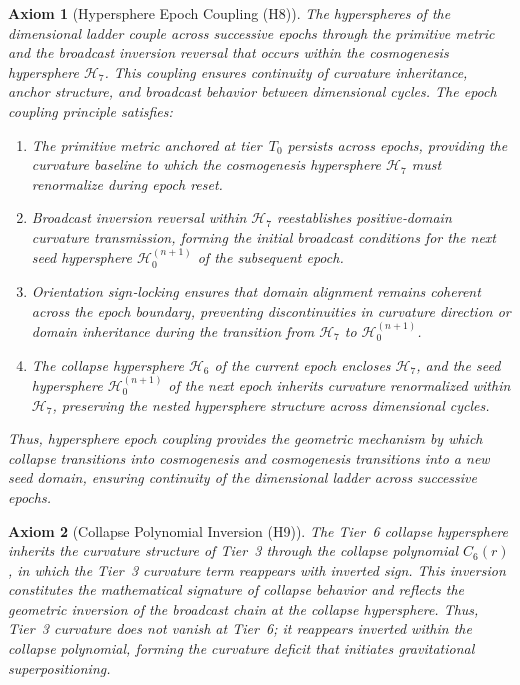 \documentclass[final,onefignum,onetabnum]{siamart}
\newtheorem{axiom}{Axiom}
\begin{document}
\begin{axiom}[Hypersphere Epoch Coupling (H8)]
The hyperspheres of the dimensional ladder couple across successive epochs through the primitive metric and the broadcast inversion reversal that occurs within the cosmogenesis hypersphere $\mathcal{H}_{7}$. This coupling ensures continuity of curvature inheritance, anchor structure, and broadcast behavior between dimensional cycles. The epoch coupling principle satisfies:

\begin{enumerate}
    \item The primitive metric anchored at tier~$T_{0}$ persists across epochs, providing the curvature baseline to which the cosmogenesis hypersphere $\mathcal{H}_{7}$ must renormalize during epoch reset.
    \item Broadcast inversion reversal within $\mathcal{H}_{7}$ reestablishes positive‑domain curvature transmission, forming the initial broadcast conditions for the next seed hypersphere $\mathcal{H}_{0}^{(n+1)}$ of the subsequent epoch.
    \item Orientation sign‑locking ensures that domain alignment remains coherent across the epoch boundary, preventing discontinuities in curvature direction or domain inheritance during the transition from $\mathcal{H}_{7}$ to $\mathcal{H}_{0}^{(n+1)}$.
    \item The collapse hypersphere $\mathcal{H}_{6}$ of the current epoch encloses $\mathcal{H}_{7}$, and the seed hypersphere $\mathcal{H}_{0}^{(n+1)}$ of the next epoch inherits curvature renormalized within $\mathcal{H}_{7}$, preserving the nested hypersphere structure across dimensional cycles.
\end{enumerate}

Thus, hypersphere epoch coupling provides the geometric mechanism by which collapse transitions into cosmogenesis and cosmogenesis transitions into a new seed domain, ensuring continuity of the dimensional ladder across successive epochs.
\end{axiom}

\begin{axiom}[Collapse Polynomial Inversion (H9)]
The Tier~6 collapse hypersphere inherits the curvature structure of Tier~3 through the collapse polynomial $C_6(r)$, in which the Tier~3 curvature term reappears with inverted sign. This inversion constitutes the mathematical signature of collapse behavior and reflects the geometric inversion of the broadcast chain at the collapse hypersphere. Thus, Tier~3 curvature does not vanish at Tier~6; it reappears inverted within the collapse polynomial, forming the curvature deficit that initiates gravitational superpositioning.
\end{axiom}
\end{document}
